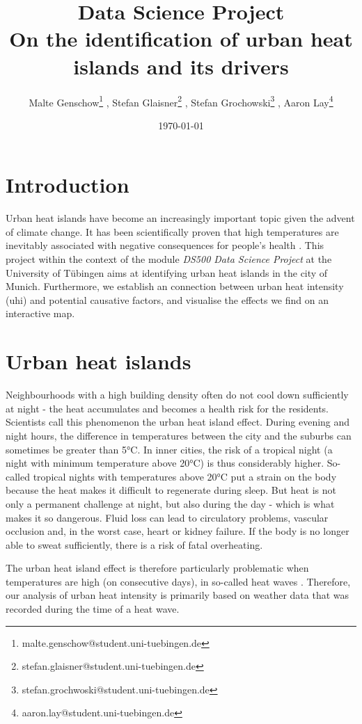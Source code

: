 \documentclass[12pt]{article}
\title{\vspace{-2cm} Data Science Project \\ On the identification of urban heat islands and its drivers}
\author{Malte Genschow\thanks{malte.genschow@student.uni-tuebingen.de} , Stefan Glaisner\thanks{stefan.glaisner@student.uni-tuebingen.de} , Stefan Grochowski\thanks{stefan.grochwoski@student.uni-tuebingen.de} , Aaron Lay\thanks{aaron.lay@student.uni-tuebingen.de}}
\date{\today}
\begin{document}
\maketitle



\section{Introduction}

Urban heat islands have become an increasingly important topic given the advent of climate change. It has been scientifically proven that high temperatures are inevitably associated with negative consequences for people's health \citep{anderson2009,basu2002,basu2009}. This project within the context of the module \emph{DS500 Data Science Project} at the University of Tübingen aims at identifying urban heat islands in the city of Munich. Furthermore, we establish an connection between urban heat intensity (\acrshort{uhi}) and potential causative factors, and visualise the effects we find on an interactive map.


\section{Urban heat islands}

Neighbourhoods with a high building density often do not cool down sufficiently at night - the heat accumulates and becomes a health risk for the residents. Scientists call this phenomenon the urban heat island effect. During evening and night hours, the difference in temperatures between the city and the suburbs can sometimes be greater than 5°C. In inner cities, the risk of a tropical night (a night with minimum temperature above 20°C) is thus considerably higher. So-called tropical nights with temperatures above 20°C put a strain on the body because the heat makes it difficult to regenerate during sleep. But heat is not only a permanent challenge at night, but also during the day - which is what makes it so dangerous. Fluid loss can lead to circulatory problems, vascular occlusion and, in the worst case, heart or kidney failure. If the body is no longer able to sweat sufficiently, there is a risk of fatal overheating.

The urban heat island effect is therefore particularly problematic when temperatures are high (on consecutive days), in so-called heat waves \citep{gasparrini2011}. Therefore, our analysis of urban heat intensity is primarily based on weather data that was recorded during the time of a heat wave.
\end{document}
